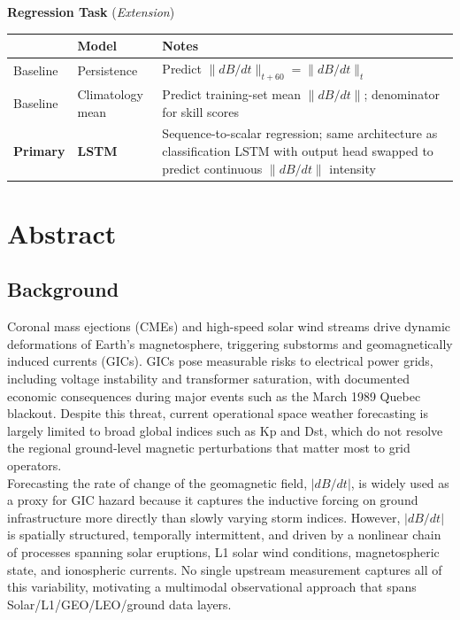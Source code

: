 \documentclass{article}
\begin{document}
\noindent \textbf{Regression Task} (\textit{Extension})

\begin{table}[h]
\centering
\begin{tabular}{|l|l|p{8cm}|}
\hline
& \textbf{Model} & \textbf{Notes} \\ \hline
Baseline & Persistence & Predict $\|dB/dt\|_{t+60} = \|dB/dt\|_t$ \\ \hline
Baseline & Climatology mean & Predict training-set mean $\|dB/dt\|$; denominator for skill scores \\ \hline
\textbf{Primary} & \textbf{LSTM} & Sequence-to-scalar regression; same architecture as classification LSTM with output head swapped to predict continuous $\|dB/dt\|$ intensity \\ \hline
\end{tabular}
\end{table}

\section*{Abstract}

\subsection*{Background}
Coronal mass ejections (CMEs) and high-speed solar wind streams drive dynamic deformations of Earth's magnetosphere, triggering substorms and geomagnetically induced currents (GICs). GICs pose measurable risks to electrical power grids, including voltage instability and transformer saturation, with documented economic consequences during major events such as the March 1989 Quebec blackout. Despite this threat, current operational space weather forecasting is largely limited to broad global indices such as Kp and Dst, which do not resolve the regional ground-level magnetic perturbations that matter most to grid operators.\\

\noindent Forecasting the rate of change of the geomagnetic field, $|dB/dt|$, is widely used as a proxy for GIC hazard because it captures the inductive forcing on ground infrastructure more directly than slowly varying storm indices. However, $|dB/dt|$ is spatially structured, temporally intermittent, and driven by a nonlinear chain of processes spanning solar eruptions, L1 solar wind conditions, magnetospheric state, and ionospheric currents. No single upstream measurement captures all of this variability, motivating a multimodal observational approach that spans Solar/L1/GEO/LEO/ground data layers.\\
\end{document}
